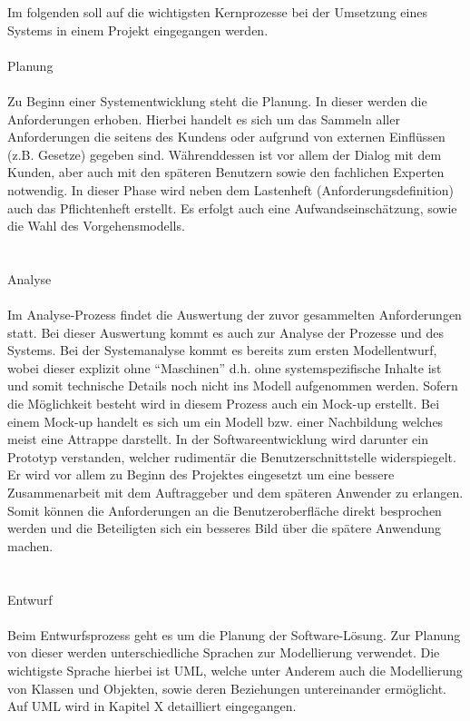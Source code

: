 Im folgenden soll auf die wichtigsten Kernprozesse bei der Umsetzung eines Systems in einem Projekt eingegangen werden.\\
\\
Planung\\
\\
Zu Beginn einer Systementwicklung steht die Planung. In dieser werden die Anforderungen erhoben. Hierbei handelt es sich um das Sammeln aller Anforderungen die seitens des Kundens oder aufgrund von externen Einflüssen (z.B. Gesetze) gegeben sind. Währenddessen ist vor allem der Dialog mit dem Kunden, aber auch mit den späteren Benutzern sowie den fachlichen Experten notwendig. In dieser Phase wird neben dem Lastenheft (Anforderungsdefinition) auch das Pflichtenheft erstellt. Es erfolgt auch eine Aufwandseinschätzung, sowie die Wahl des Vorgehensmodells.\\
\\
\\
Analyse\\
\\
Im Analyse-Prozess findet die Auswertung der zuvor gesammelten Anforderungen statt. Bei dieser Auswertung kommt es auch zur Analyse der Prozesse und des Systems. Bei der Systemanalyse kommt es bereits zum ersten Modellentwurf, wobei dieser explizit ohne “Maschinen” d.h. ohne systemspezifische Inhalte ist und somit technische Details noch nicht ins Modell aufgenommen werden. Sofern die Möglichkeit besteht wird in diesem Prozess auch ein Mock-up erstellt. Bei einem Mock-up handelt es sich um ein Modell bzw. einer Nachbildung welches meist eine Attrappe darstellt. In der Softwareentwicklung wird darunter ein Prototyp verstanden, welcher rudimentär die Benutzerschnittstelle widerspiegelt. Er wird vor allem zu Beginn des Projektes eingesetzt um eine bessere Zusammenarbeit mit dem Auftraggeber und dem späteren Anwender zu erlangen. Somit können die Anforderungen an die Benutzeroberfläche direkt besprochen werden und die Beteiligten sich ein besseres Bild über die spätere Anwendung machen.\\
\\
\\
Entwurf\\
\\
Beim Entwurfsprozess geht es um die Planung der Software-Lösung. Zur Planung von dieser werden unterschiedliche Sprachen zur Modellierung verwendet. Die wichtigste Sprache hierbei ist UML, welche unter Anderem auch die Modellierung von Klassen und Objekten, sowie deren Beziehungen untereinander ermöglicht. Auf UML wird in Kapitel X detailliert eingegangen.
